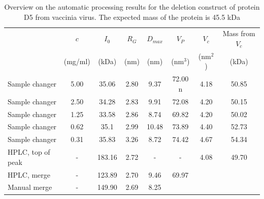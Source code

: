 \documentclass[preprint,pdf]{iucr}              %
\begin{document}
\begin{table}
\begin{tabular}{ l c | c c c c c c }
   & $c$  & $I_{0}$  & $R_{G}$ & $D_{max}$ & $V_{P}$ & $V_{c}$ & Mass from $V_{c}$\\
	 &  (mg/ml) & (kDa) & (nm)&  (nm)&  (nm$^{3}$) & (nm$^{2}$) & (kDa)\\
\hline
Sample changer & 5.00  & 35.06 & 2.80 & 9.37  & 72.00 n& 4.18 & 50.85 \\
Sample changer & 2.50  & 34.28 & 2.83  & 9.91  & 72.08 & 4.20 & 50.15 \\
Sample changer & 1.25 & 33.58& 2.86  & 8.74  & 69.82 & 4.20 & 50.02 \\
Sample changer & 0.62  & 35.1& 2.99  & 10.48 & 73.89 & 4.40 & 52.73 \\
Sample changer & 0.31 & 35.83  & 3.26  & 8.72  & 74.42& 4.67 & 54.34 \\
HPLC, top of peak & - & 183.16 & 2.72  & -  & - & 4.08 & 49.70 \\
HPLC, merge & - & 123.89 & 2.70  & 9.46 & 69.97 & &  \\
Manual merge & - &  149.90 & 2.69 & 8.25 & & &  \\
\end{tabular}
\caption{Overview on the automatic processing results for the deletion construct of protein D5 from vaccinia virus. 
The expected mass of the protein is 45.5 kDa}
\label{tbl:results}
\end{table}
\end{document}
